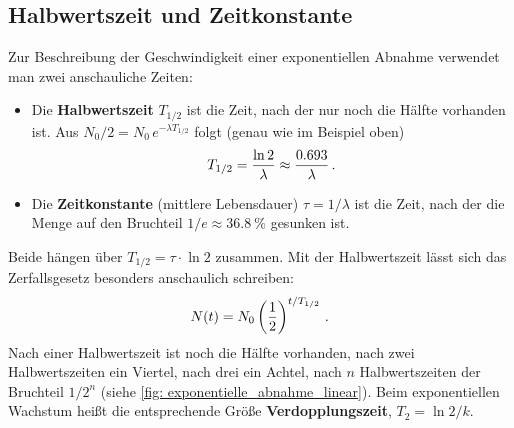\subsection{Halbwertszeit und Zeitkonstante}
Zur Beschreibung der Geschwindigkeit einer exponentiellen Abnahme verwendet man zwei anschauliche Zeiten:
\begin{itemize}[itemsep=1.5pt]
    \item Die \textbf{Halbwertszeit} $T_{1/2}$ ist die Zeit, nach der nur noch die Hälfte vorhanden ist. Aus $N_0/2 = N_0\,e^{-\lambda T_{1/2}}$ folgt (genau wie im Beispiel oben)
    \begin{equation}\label{eq: halbwertszeit}
        T_{1/2} = \frac{\ln 2}{\lambda} \approx \frac{\num{0.693}}{\lambda} \,.
    \end{equation}
    \item Die \textbf{Zeitkonstante} (mittlere Lebensdauer) $\tau = 1/\lambda$ ist die Zeit, nach der die Menge auf den Bruchteil $1/e \approx \SI{36.8}{\percent}$ gesunken ist.
\end{itemize}
Beide hängen über $T_{1/2} = \tau \cdot \ln 2$ zusammen. Mit der Halbwertszeit lässt sich das Zerfallsgesetz besonders anschaulich schreiben:
\begin{equation}\label{eq: zerfallsgesetz_halbwertszeit}
    N(t) = N_0 \left(\frac{1}{2}\right)^{t/T_{1/2}} \,.
\end{equation}
Nach einer Halbwertszeit ist noch die Hälfte vorhanden, nach zwei Halbwertszeiten ein Viertel, nach drei ein Achtel, nach $n$ Halbwertszeiten der Bruchteil $1/2^n$ (siehe \cref{fig: exponentielle_abnahme_linear}). Beim exponentiellen Wachstum heißt die entsprechende Größe \textbf{Verdopplungszeit}, $T_2 = \ln 2 / k$.

